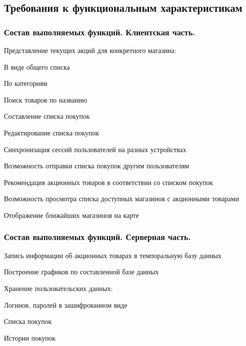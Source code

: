 \subsection{Требования к функциональным характеристикам}

\subsubsection{Состав выполняемых функций. Клиентская часть.}
\begin{my_enumerate}
\item Представление текущих акций для конкретного магазина:
    \begin{my_enumerate}
    \item В виде общего списка
    \item По категориям
    \end{my_enumerate}
\item Поиск товаров по названию
\item Составление списка покупок
\item Редактирование списка покупок
\item Синхронизация сессий пользователей на разных устройствах
\item Возможность отправки списка покупок другим пользователям
\item Рекомендация акционных товаров в соответствии со списком покупок
\item Возможность просмотра списка доступных магазинов с акционными товарами
\item Отображение ближайших магазинов на карте
\end{my_enumerate}

\subsubsection{Состав выполняемых функций. Серверная часть.}
\begin{my_enumerate}
\item Запись информации об акционных товарах в темпоральную базу данных
\item Построение графиков по составленной базе данных
\item Хранение пользовательских данных:
    \begin{my_enumerate}
        \item Логинов, паролей в зашифрованном виде
        \item Списка покупок 
        \item Истории покупок
    \end{my_enumerate}
\end{my_enumerate}

